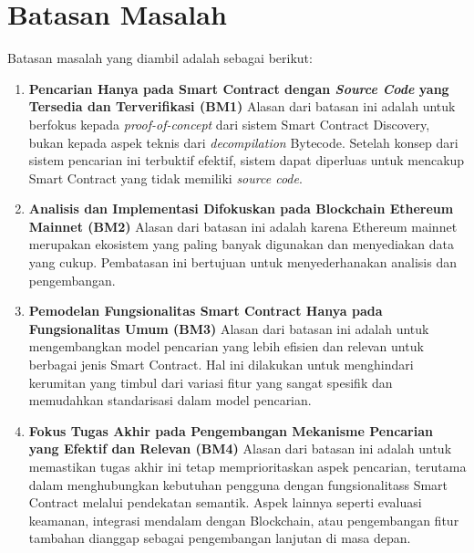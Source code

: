 \section{Batasan Masalah}
\label{sec:batasan-masalah}


Batasan masalah yang diambil adalah sebagai berikut:

\begin{enumerate}
  \item \textbf{Pencarian Hanya pada Smart Contract dengan \textit{Source Code} yang Tersedia dan Terverifikasi (BM1)} \newline
  Alasan dari batasan ini adalah untuk berfokus kepada \textit{proof-of-concept} dari sistem Smart Contract Discovery, bukan kepada aspek teknis dari \textit{decompilation} Bytecode. Setelah konsep dari sistem pencarian ini terbuktif efektif, sistem dapat diperluas untuk mencakup Smart Contract yang tidak memiliki \textit{source code}.
  \item \textbf{Analisis dan Implementasi Difokuskan pada Blockchain Ethereum Mainnet (BM2)} \newline
  Alasan dari batasan ini adalah karena Ethereum mainnet merupakan ekosistem yang paling banyak digunakan dan menyediakan data yang cukup. Pembatasan ini bertujuan untuk menyederhanakan analisis dan pengembangan.
  \item \textbf{Pemodelan Fungsionalitas Smart Contract Hanya pada Fungsionalitas Umum (BM3)} \newline
  Alasan dari batasan ini adalah untuk mengembangkan model pencarian yang lebih efisien dan relevan untuk berbagai jenis Smart Contract. Hal ini dilakukan untuk menghindari kerumitan yang timbul dari variasi fitur yang sangat spesifik dan memudahkan standarisasi dalam model pencarian.
  \item \textbf{Fokus Tugas Akhir pada Pengembangan Mekanisme Pencarian yang Efektif dan Relevan (BM4)} \newline
  Alasan dari batasan ini adalah untuk memastikan tugas akhir ini tetap memprioritaskan aspek pencarian, terutama dalam menghubungkan kebutuhan pengguna dengan fungsionalitass Smart Contract melalui pendekatan semantik. Aspek lainnya seperti evaluasi keamanan, integrasi mendalam dengan Blockchain, atau pengembangan fitur tambahan dianggap sebagai pengembangan lanjutan di masa depan.
\end{enumerate}